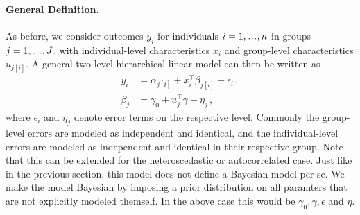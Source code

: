 \paragraph{General Definition.}
As before, we consider outcomes $y_i$ for individuals $i=1,\mydots,n$ in groups $j=1,\mydots,J$, with individual-level characteristics $x_i$ and group-level characteristics $u_{j[i]}$.
A general two-level hierarchical linear model can then be written as
\begin{align}
  y_i &= \alpha_{j[i]} + x_i^{\intercal} \beta_{j[i]} + \epsilon_i \,, \tag{Individual Level}\\
  \beta_j &= \gamma_0 + u_j^{\intercal} \gamma + \eta_j \, \tag{Group Level},
\end{align}
where $\epsilon_i$ and $\eta_j$ denote error terms on the respective level.
Commonly the group-level errors are modeled as independent and identical, and the individual-level errors are modeled as independent and identical in their respective group.
Note that this can be extended for the heteroscedastic or autocorrelated case.
Just like in the previous section, this model does not define a Bayesian model per se.
We make the model Bayesian by imposing a prior distribution on all paramters that are not explicitly modeled themself.
In the above case this would be $\gamma_0, \gamma, \epsilon$ and $\eta$.

